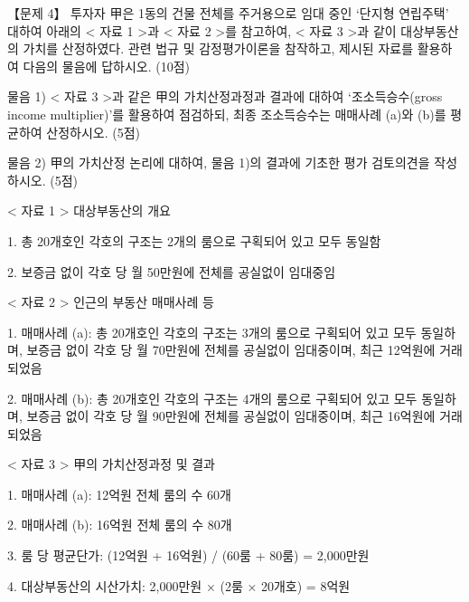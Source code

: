 \begin{longquestion}{【문제 4】}
투자자 甲은 1동의 건물 전체를 주거용으로 임대 중인 ‘단지형 연립주택’ 대하여 아래의 < 자료 1 >과 < 자료 2 >를 참고하여, < 자료 3 >과 같이 대상부동산의 가치를 산정하였다. 관련 법규 및 감정평가이론을 참작하고, 제시된 자료를 활용하여 다음의 물음에 답하시오. (10점) \par
\medskip\noindent 물음 1) < 자료 3 >과 같은 甲의 가치산정과정과 결과에 대하여 ‘조소득승수(gross income multiplier)’를 활용하여 점검하되, 최종 조소득승수는 매매사례 (a)와 (b)를 평균하여 산정하시오. (5점) \par
\medskip\noindent 물음 2) 甲의 가치산정 논리에 대하여, 물음 1)의 결과에 기초한 평가 검토의견을 작성하시오. (5점) \par
< 자료 1 > 대상부동산의 개요 \par
1. 총 20개호인 각호의 구조는 2개의 룸으로 구획되어 있고 모두 동일함 \par
2. 보증금 없이 각호 당 월 50만원에 전체를 공실없이 임대중임 \par
< 자료 2 > 인근의 부동산 매매사례 등 \par
1. 매매사례 (a): 총 20개호인 각호의 구조는 3개의 룸으로 구획되어 있고 모두 동일하며, 보증금 없이 각호 당 월 70만원에 전체를 공실없이 임대중이며, 최근 12억원에 거래되었음 \par
2. 매매사례 (b): 총 20개호인 각호의 구조는 4개의 룸으로 구획되어 있고 모두 동일하며, 보증금 없이 각호 당 월 90만원에 전체를 공실없이 임대중이며, 최근 16억원에 거래되었음 \par
< 자료 3 > 甲의 가치산정과정 및 결과 \par
1. 매매사례 (a): 12억원 전체 룸의 수 60개 \par
2. 매매사례 (b): 16억원 전체 룸의 수 80개 \par
3. 룸 당 평균단가: (12억원 + 16억원) / (60룸 + 80룸) = 2,000만원 \par
4. 대상부동산의 시산가치: 2,000만원 × (2룸 × 20개호) = 8억원 \par
\end{longquestion}
